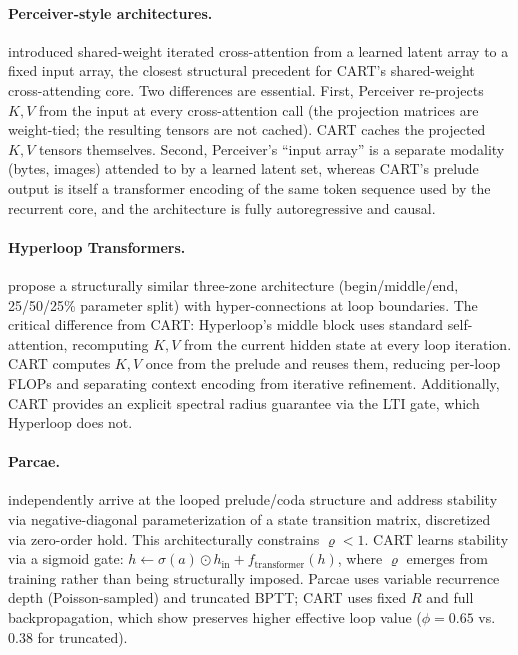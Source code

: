 \documentclass{article}
\newcommand{\cart}{\textsc{CART}}
\begin{document}
\paragraph{Perceiver-style architectures.}
\citet{jaegle2021perceiver,jaegle2022perceiverio} introduced shared-weight iterated cross-attention from a learned latent array to a fixed input array, the closest structural precedent for \cart{}'s shared-weight cross-attending core. Two differences are essential. First, Perceiver re-projects $K, V$ from the input at every cross-attention call (the projection matrices are weight-tied; the resulting tensors are not cached). \cart{} caches the projected $K, V$ tensors themselves. Second, Perceiver's ``input array'' is a separate modality (bytes, images) attended to by a learned latent set, whereas \cart{}'s prelude output is itself a transformer encoding of the same token sequence used by the recurrent core, and the architecture is fully autoregressive and causal.

\paragraph{Hyperloop Transformers.}
\citet{zeitoun2026hyperloop} propose a structurally similar three-zone architecture (begin/middle/end, 25/50/25\% parameter split) with hyper-connections at loop boundaries. The critical difference from \cart{}: Hyperloop's middle block uses standard self-attention, recomputing $K, V$ from the current hidden state at every loop iteration. \cart{} computes $K, V$ once from the prelude and reuses them, reducing per-loop FLOPs and separating context encoding from iterative refinement. Additionally, \cart{} provides an explicit spectral radius guarantee via the LTI gate, which Hyperloop does not.

\paragraph{Parcae.}
\citet{prairie2026parcae} independently arrive at the looped prelude/coda structure and address stability via negative-diagonal parameterization of a state transition matrix, discretized via zero-order hold. This architecturally constrains $\varrho < 1$. \cart{} learns stability via a sigmoid gate: $h \leftarrow \sigma(a) \odot h_\text{in} + f_\text{transformer}(h)$, where $\varrho$ emerges from training rather than being structurally imposed. Parcae uses variable recurrence depth (Poisson-sampled) and truncated BPTT; \cart{} uses fixed $R$ and full backpropagation, which \citet{schwethelm2026isodepth} show preserves higher effective loop value ($\phi = 0.65$ vs.\ $0.38$ for truncated).
\end{document}
